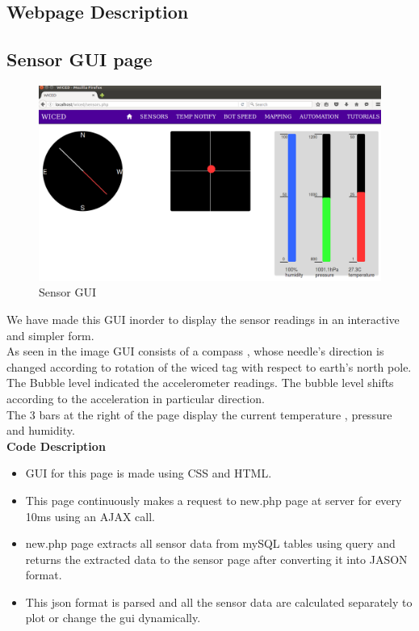 \documentclass[a4paper,12pt,oneside]{book}
\begin{document}
\begin{itemize}
\newpage
\section{Webpage Description}

\subsection{Sensor GUI page}

\begin{figure}[h]
        \centering
    	\includegraphics[scale=0.2]{sensor.png}
    	\caption{Sensor GUI}
	    \end{figure}
	    
	    \hspace{5mm}We have made this GUI inorder to display the sensor readings in an interactive and simpler form.\\ As seen in the image GUI consists of a compass , whose needle's direction is changed according to rotation of the wiced tag with respect to earth's north pole.
        \\The Bubble level indicated the accelerometer readings. The bubble level shifts according to the acceleration in particular direction.
        \\The 3 bars at the right of the page display the current temperature , pressure and humidity.\\

        \textbf{Code Description}
        
        \begin{itemize}
        \item GUI for this page is made using CSS and HTML.
        \item This page continuously makes a request to new.php page at server for every 10ms using an AJAX call.
        \item new.php page extracts all sensor data from mySQL tables using query and returns the extracted data to the sensor page after converting it into JASON format.
        \item This json format is parsed and all the sensor data are calculated separately to plot or change the gui dynamically.
        

\end{itemize}
\end{itemize}
\end{document}
